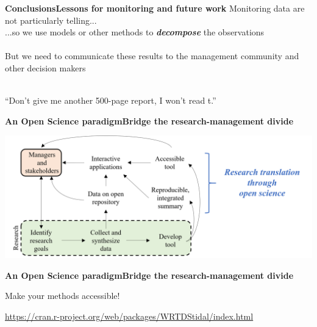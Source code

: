 \documentclass[serif]{beamer}\usepackage[]{graphicx}\usepackage[]{color}
\newcommand{\emtxt}[1]{\textbf{\textit{#1}}}
\begin{document}
\begin{frame}{\textbf{Conclusions}}{\textbf{Lessons for monitoring and future work}}
\onslide<+->
Monitoring data are not particularly telling... \\
...so we use models or other methods to \emtxt{decompose} the observations \\~\\
\onslide<+->
But we need to communicate these results to the management community and other decision makers\\~\\
\onslide<+->
\begin{exampleblock}{}
  {\large ``Don't give me another 500-page report, I won't read t.''}
  \vskip5mm
  \hspace*{}
\end{exampleblock}
\end{frame}

\begin{frame}{\textbf{An Open Science paradigm}}{\textbf{Bridge the research-management divide}}
\begin{center}
\includegraphics[width = \textwidth]{fig/opensci.png}
\end{center}
\end{frame}

\begin{frame}{\textbf{An Open Science paradigm}}{\textbf{Bridge the research-management divide}}
\centerline{Make your methods accessible!}
\centerline{{\small \url{https://cran.r-project.org/web/packages/WRTDStidal/index.html}}}
\begin{center}
\end{center}
\end{frame}
\end{document}
